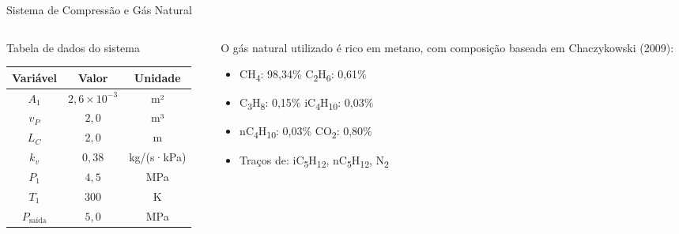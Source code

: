 \begin{frame}{Sistema de Compressão e Gás Natural}
    \begin{columns}[T] %
        \begin{column}{0.48\textwidth}
            \begin{block}{\centering Tabela de dados do sistema}
                \footnotesize
                \centering
                \begin{tabular}{ccc}
                    \toprule
                    \textbf{Variável} & \textbf{Valor} & \textbf{Unidade} \\
                    \midrule
                    $A_1$ & $2{,}6 \times 10^{-3}$ & m² \\
                    $v_P$ & $2{,}0$ & m³ \\
                    $L_C$ & $2{,}0$ & m \\
                    $k_v$ & $0{,}38$ & kg/(s·kPa) \\
                    $P_1$ & $4{,}5$ & MPa \\
                    $T_1$ & $300$ & K \\
                    $P_{\text{saída}}$ & $5{,}0$ & MPa \\
                    \bottomrule
                \end{tabular}
            \end{block}
        \end{column}

        \begin{column}{0.52\textwidth}
            \scriptsize
            O gás natural utilizado é rico em metano, com composição baseada em Chaczykowski (2009):
            
            \vspace{0.15cm}
            \begin{itemize}
                \item CH\textsubscript{4}: 98,34\% \quad C\textsubscript{2}H\textsubscript{6}: 0,61\%
                \item C\textsubscript{3}H\textsubscript{8}: 0,15\% \quad iC\textsubscript{4}H\textsubscript{10}: 0,03\%
                \item nC\textsubscript{4}H\textsubscript{10}: 0,03\% \quad CO\textsubscript{2}: 0,80\%
                \item Traços de: iC\textsubscript{5}H\textsubscript{12}, nC\textsubscript{5}H\textsubscript{12}, N\textsubscript{2}
            \end{itemize}


\end{column}
\end{columns}
\end{frame}
